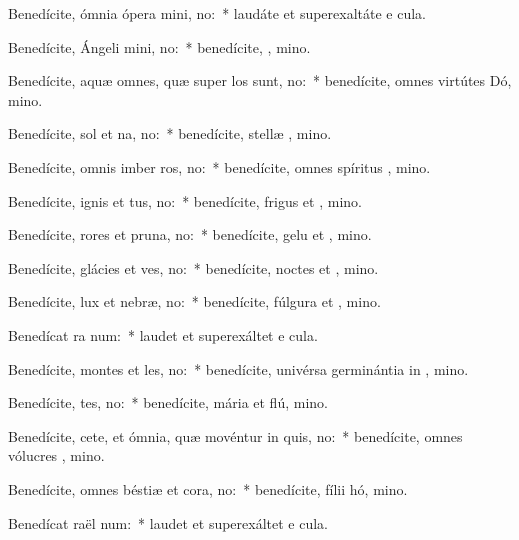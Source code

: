 \item Benedícite, ómnia ópera mini, no:~* laudáte et superexaltáte e  cula.
\item Benedícite, Ángeli mini, no:~* benedícite, , mino.
\item Benedícite, aquæ omnes, quæ super los sunt, no:~* benedícite, omnes virtútes Dó, mino.
\item Benedícite, sol et na, no:~* benedícite, stellæ , mino.
\item Benedícite, omnis imber  ros, no:~* benedícite, omnes spíritus , mino.
\item Benedícite, ignis et tus, no:~* benedícite, frigus et , mino.
\item Benedícite, rores et pruna, no:~* benedícite, gelu et , mino.
\item Benedícite, glácies et ves, no:~* benedícite, noctes et , mino.
\item Benedícite, lux et nebræ, no:~* benedícite, fúlgura et , mino.
\item Benedícat ra num:~* laudet et superexáltet e  cula.
\item Benedícite, montes et les, no:~* benedícite, univérsa germinántia in , mino.
\item Benedícite, tes, no:~* benedícite, mária et flú, mino.
\item Benedícite, cete, et ómnia, quæ movéntur in quis, no:~* benedícite, omnes vólucres , mino.
\item Benedícite, omnes béstiæ et cora, no:~* benedícite, fílii hó, mino.
\item Benedícat raël num:~* laudet et superexáltet e  cula.
